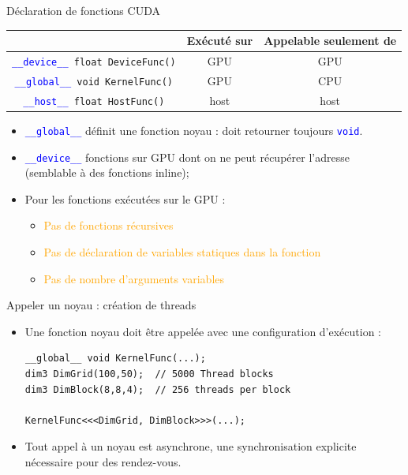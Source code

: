\documentclass[handout,francais]{beamer}
\begin{document}
\begin{frame}{Déclaration de fonctions CUDA}

  \begin{tabular}{|c|c|c|}\hline
 & \begin{minipage}{2cm}\small Exécuté sur \end{minipage} & 
 \begin{minipage}{2cm}\small Appelable seulement de \end{minipage} \\ \hline \hline
\texttt{\textcolor{blue}{\_\_device\_\_} float DeviceFunc()} &
GPU & GPU \\ \hline
\texttt{\textcolor{blue}{\_\_global\_\_} void KernelFunc()} &
GPU & CPU \\ \hline
\texttt{\textcolor{blue}{\_\_host\_\_} float HostFunc()} & host & host \\
\hline
\end{tabular}

\begin{itemize}
\item \texttt{\textcolor{blue}{\_\_global\_\_}} définit une fonction noyau :
doit retourner toujours \textcolor{blue}{\tt void}.
\item \textcolor{blue}{\tt \_\_device\_\_} fonctions sur GPU dont on ne peut
récupérer l'adresse (semblable à des fonctions inline);
\item Pour les fonctions exécutées sur le GPU :
  \begin{itemize}
  \item \textcolor{orange}{Pas de fonctions récursives}
  \item \textcolor{orange}{Pas de déclaration de variables statiques dans la fonction}
  \item \textcolor{orange}{Pas de nombre d'arguments variables}
  \end{itemize}
\end{itemize}
\end{frame}

\begin{frame}[containsverbatim]{Appeler un noyau : création de threads}

\begin{itemize}
\item Une fonction noyau doit être appelée avec une configuration d'exécution :
\begin{lstlisting}
__global__ void KernelFunc(...);
dim3 DimGrid(100,50);  // 5000 Thread blocks
dim3 DimBlock(8,8,4);  // 256 threads per block

KernelFunc<<<DimGrid, DimBlock>>>(...);
\end{lstlisting}
\item Tout appel à un noyau est asynchrone, une synchronisation
  explicite nécessaire pour des rendez-vous.
\end{itemize}
\end{frame}
\end{document}
